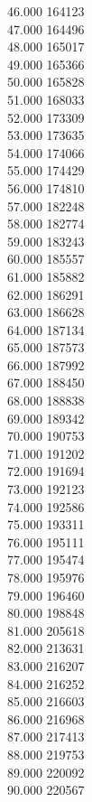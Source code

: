 { 46.000	164123 \\
 47.000	164496 \\
 48.000	165017 \\
 49.000	165366 \\
 50.000	165828 \\
 51.000	168033 \\
 52.000	173309 \\
 53.000	173635 \\
 54.000	174066 \\
 55.000	174429 \\
 56.000	174810 \\
 57.000	182248 \\
 58.000	182774 \\
 59.000	183243 \\
 60.000	185557 \\
 61.000	185882 \\
 62.000	186291 \\
 63.000	186628 \\
 64.000	187134 \\
 65.000	187573 \\
 66.000	187992 \\
 67.000	188450 \\
 68.000	188838 \\
 69.000	189342 \\
 70.000	190753 \\
 71.000	191202 \\
 72.000	191694 \\
 73.000	192123 \\
 74.000	192586 \\
 75.000	193311 \\
 76.000	195111 \\
 77.000	195474 \\
 78.000	195976 \\
 79.000	196460 \\
 80.000	198848 \\
 81.000	205618 \\
 82.000	213631 \\
 83.000	216207 \\
 84.000	216252 \\
 85.000	216603 \\
 86.000	216968 \\
 87.000	217413 \\
 88.000	219753 \\
 89.000	220092 \\
 90.000	220567 \\
}
